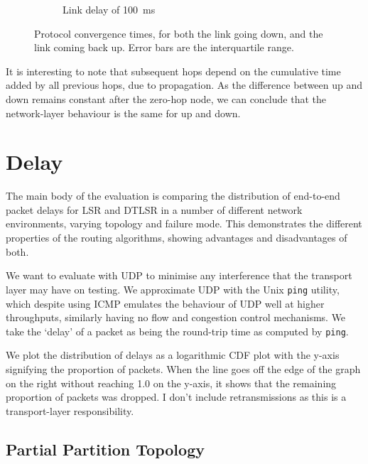 \documentclass[withindex,glossary,openany]{cam-thesis}
\begin{document}
\begin{figure}[H]
\begin{subfigure}{.5\textwidth}
  \caption{Link delay of \SI{100}{\ms}}
  \label{fig:conv_100ms}
\end{subfigure}
\caption{Protocol convergence times, for both the link going down, and the link coming back up. Error bars are the interquartile range.}
\label{fig:conv}
\end{figure}

It is interesting to note that subsequent hops depend on the cumulative time added by all previous hops, due to propagation. As the difference between up and down remains constant after the zero-hop node, we can conclude that the network-layer behaviour is the same for up and down.


\section{Delay}

The main body of the evaluation is comparing the distribution of end-to-end packet delays for LSR and DTLSR in a number of different network environments, varying topology and failure mode. This demonstrates the different properties of the routing algorithms, showing advantages and disadvantages of both.

We want to evaluate with UDP to minimise any interference that the transport layer may have on testing. We approximate UDP with the Unix \texttt{ping} utility, which despite using ICMP emulates the behaviour of UDP well at higher throughputs, similarly having no flow and congestion control mechanisms. We take the `delay' of a packet as being the round-trip time as computed by \texttt{ping}.

We plot the distribution of delays as a logarithmic CDF plot with the y-axis signifying the proportion of packets. When the line goes off the edge of the graph on the right without reaching 1.0 on the y-axis, it shows that the remaining proportion of packets was dropped. I don't include retransmissions as this is a transport-layer responsibility.

\subsection{Partial Partition Topology}
\end{document}
